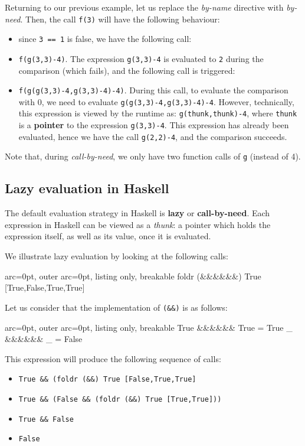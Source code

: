 Returning to our previous example, let us replace the \textit{by-name} directive with \textit{by-need}. Then, the call \texttt{f(3)} will have the following behaviour:
\begin{itemize}
	\item  since \texttt{3 == 1} is false, we have the following call:
	\item  \texttt{f(g(3,3)-4)}. The expression \texttt{g(3,3)-4} is evaluated to \texttt{2} during the comparison (which fails), and the following call is triggered:
	\item  \texttt{f(g(g(3,3)-4,g(3,3)-4)-4)}. During this call, to evaluate the comparison with 0, we need to evaluate \texttt{g(g(3,3)-4,g(3,3)-4)-4}. However, technically, this expression is viewed by the runtime as: \texttt{g(thunk,thunk)-4}, where \texttt{thunk} is a \textbf{pointer} to the expression \texttt{g(3,3)-4}. This expression has already been evaluated, hence we have the call \texttt{g(2,2)-4}, and the comparison succeeds.
\end{itemize}

Note that, during \textit{call-by-need}, we only have two function calls of \texttt{g} (instead of 4).

\subsection*{ Lazy evaluation in Haskell }

The default evaluation strategy in Haskell is \textbf{lazy} or \textbf{call-by-need}. Each expression in Haskell can be viewed as a \textit{thunk}: a pointer which holds the expression itself, as well as its value, once it is evaluated. 

We illustrate lazy evaluation by looking at the following calls:

\begin{tcblisting}{ arc=0pt, outer arc=0pt, listing only, breakable}
foldr (&\&&&\&&) True [True,False,True,True]

\end{tcblisting}

Let us consider that the implementation of \texttt{(\&\&)} is as follows:

\begin{tcblisting}{ arc=0pt, outer arc=0pt, listing only, breakable}
True &\&&&\&& True = True
_ &\&&&\&& _ = False

\end{tcblisting}

This expression will produce the following sequence of calls:
\begin{itemize}
	\item  \texttt{True \&\& (foldr (\&\&) True [False,True,True]}
	\item  \texttt{True \&\& (False \&\& (foldr (\&\&) True [True,True]))}
	\item  \texttt{True \&\& False}
	\item  \texttt{False}
\end{itemize}

